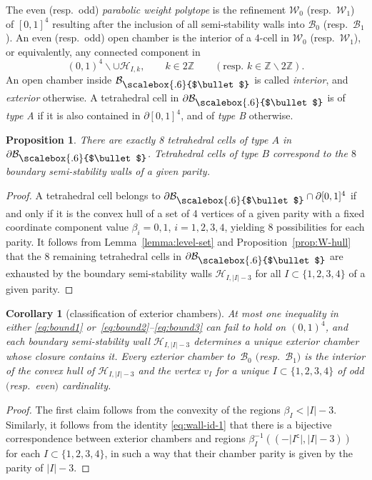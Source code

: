 \documentclass[10pt,a4paper]{amsart}
\newcommand{\field}[1]{\ensuremath{\mathbb{#1}}}
\newcommand{\ZZ}{\field{Z}}
\newcommand\sbul[1][.6]{\mathbin{\vcenter{\hbox{\scalebox{#1}{$\bullet$}}}}}
\newcommand{\qB}{\mathcal{B}}
\newcommand{\qH}{\mathcal{H}}
\newcommand{\qW}{\mathcal{W}}
\numberwithin{equation}{section}
\newtheorem{Corollary}[Theorem]{Corollary}
\newtheorem{Proposition}[Theorem]{Proposition}
 { \theoremstyle{definition}
\newtheorem{Definition}[Theorem]{Definition}
\newtheorem{Note}[Theorem]{Note}
\newtheorem{Example}[Theorem]{Example}
\newtheorem{Remark}[Theorem]{Remark} }
\begin{document}
\begin{Definition}
The even (resp.~odd) \textit{parabolic weight polytope} is the refinement $\qW_{0}$ (resp.~$\qW_{1}$) of $[0,1]^{4}$ resulting after the inclusion of all semi-stability walls into $\qB_{0}$ (resp.~$\qB_{1}$). An even (resp.~odd) {open chamber} is the interior of a 4-cell in $\qW_{0}$ (resp.~$\qW_{1}$), or equivalently, any connected component in
\[
(0,1)^{4}\backslash\cup \qH_{I,k},\qquad k\in 2\ZZ\qquad (\text{resp.~} k\in\ZZ\backslash 2\ZZ).
\]
An open chamber inside $\qB_{\sbul}$ is called \emph{interior}, and \emph{exterior} otherwise. A tetrahedral cell in $\partial\qB_{\sbul}$ is of \textit{type A} if it is also contained in $\partial[0,1]^{4}$, and of \textit{type B} otherwise.
\end{Definition}

\begin{Proposition}%
There are exactly 8 tetrahedral cells of type $A$ in $\partial\qB_{\sbul}$.
Tetrahedral cells of type $B$ correspond to the $8$ boundary semi-stability walls of a given parity.
\end{Proposition}

\begin{proof}
A tetrahedral cell belongs to $\partial\qB_{\sbul}\cap\partial[0,1]^{4}$ if and only if it is the convex hull of a set of 4 vertices of a given parity with a fixed coordinate component value $\beta_{i}=0,1$, $i=1,2,3,4$, yielding 8 possibilities for each parity. It follows from Lemma~\ref{lemma:level-set} and Proposition~\ref{prop:W-hull} that the 8 remaining tetrahedral cells in $\partial\qB_{\sbul}$ are exhausted by the boundary semi-stability walls $\qH_{I,\vert I\vert -3}$ for all $I\subset\{1,2,3,4\}$ of a given parity.
\end{proof}

\begin{Corollary}[classification of exterior chambers]\label{cor:ex-chambers}
At most one inequality in either \eqref{eq:bound1} or~\eqref{eq:bound2}--\eqref{eq:bound3} can fail to hold on $(0,1)^{4}$, and each boundary semi-stability wall $\qH_{I,\vert I\vert - 3}$ determines a unique exterior chamber whose closure contains it. Every exterior chamber to~$\qB_{0}$ $($resp.~$\qB_{1})$ is the interior of the convex hull of $\qH_{I,\vert I\vert - 3}$ and the vertex $v_{I}$ for a unique $I\subset \{1,2,3,4\}$ of odd $($resp.~even$)$ cardinality.
\end{Corollary}

\begin{proof}
The first claim follows from the convexity of the regions $\beta_{I} < \vert I\vert - 3$. Similarly, it follows from the identity \eqref{eq:wall-id-1} that there is a bijective correspondence between exterior chambers and regions $\beta^{-1}_{I}((-\vert I^{\mathsf{c}}\vert ,\vert I\vert - 3))$ for each $I\subset\{1,2,3,4\}$, in such a way that their chamber parity is given by the parity of $\vert I\vert -3$.
\end{proof}
\end{document}
